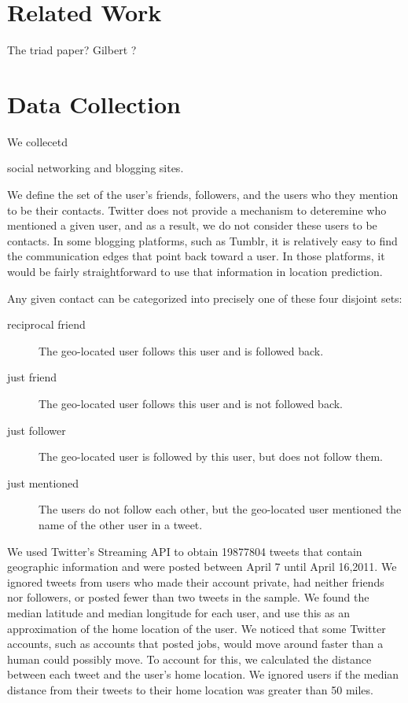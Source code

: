 \documentclass{sig-alternate}
\begin{document}
\section{Related Work}
\cite{scellato2011socio}
\cite{scellato2010distance}
\cite{backstrom2010find}
\cite{cheng2010you}
\cite{backstrom2008spatial}
\cite{gilbert2009predicting}
\cite{cranshaw2010bridging}
\cite{java2007we}
The triad paper?
Gilbert ?


\section{Data Collection}
We collecetd 

social networking and blogging sites.

We define the set of the user's friends, followers, and the users who they mention to be their contacts.
Twitter does not provide a mechanism to deteremine who mentioned a given user, and as a result, we do not consider these users to be contacts.
In some blogging platforms, such as Tumblr, it is relatively easy to find the communication edges that point back toward a user.
In those platforms, it would be fairly straightforward to use that information in location prediction.

Any given contact can be categorized into precisely one of these four disjoint sets:
\begin{description}
\item[reciprocal friend] The geo-located user follows this user and is followed back.
\item[just friend] The geo-located user follows this user and is not followed back.
\item[just follower]The geo-located user is followed by this user, but does not follow them.
\item[just mentioned] The users do not follow each other, but the geo-located user mentioned the name of the other user in a tweet.
\end{description}

We used Twitter's Streaming API to obtain 19877804 tweets that contain
geographic information and were posted between April 7 until April 16,2011.
We ignored tweets from users who made their account private, had neither
friends nor followers, or posted fewer than two tweets in the sample.
We found the median latitude and median longitude for each user, and use this
as an approximation of the home location of the user.
We noticed that some Twitter accounts, such as accounts that posted jobs, would
move around faster than a human could possibly move. To account for this, we
calculated the distance between each tweet and the user's home location. We
ignored users if the median distance from their tweets to their home location
was greater than 50 miles.
\end{document}
